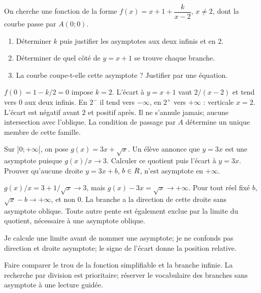 \label{t11s-c03-p01}
On cherche une fonction de la forme $f(x)=x+1+\dfrac{k}{x-2}$, $x\ne2$, dont la courbe passe par $A(0;0)$.
\begin{enumerate}
\item Déterminer $k$ puis justifier les asymptotes aux deux infinis et en $2$.
\item Déterminer de quel côté de $y=x+1$ se trouve chaque branche.
\item La courbe coupe-t-elle cette asymptote ? Justifier par une équation.
\end{enumerate}
\begin{corrige}\label{sol-t11s-c03-p01}
$f(0)=1-k/2=0$ impose $k=2$. L’écart à $y=x+1$ vaut $2/(x-2)$ et tend vers $0$ aux deux infinis. En $2^-$ il tend vers $-\infty$, en $2^+$ vers $+\infty$ : verticale $x=2$. L’écart est négatif avant $2$ et positif après. Il ne s’annule jamais; aucune intersection avec l’oblique. La condition de passage par $A$ détermine un unique membre de cette famille.
\end{corrige}
\label{t11s-c03-p02}
Sur $]0;+\infty[$, on pose $g(x)=3x+\sqrt x$. Un élève annonce que $y=3x$ est une asymptote puisque $g(x)/x\to3$. Calculer ce quotient puis l’écart à $y=3x$. Prouver qu’aucune droite $y=3x+b$, $b\in R$, n’est asymptote en $+\infty$.
\begin{corrige}\label{sol-t11s-c03-p02}
$g(x)/x=3+1/\sqrt x\to3$, mais $g(x)-3x=\sqrt x\to+\infty$. Pour tout réel fixé $b$, $\sqrt x-b\to+\infty$, et non $0$. La branche a la direction de cette droite sans asymptote oblique. Toute autre pente est également exclue par la limite du quotient, nécessaire à une asymptote oblique.
\end{corrige}

\begin{jemeteste}Je calcule une limite avant de nommer une asymptote; je ne confonds pas direction et droite asymptote; le signe de l’écart donne la position relative.\end{jemeteste}
\begin{notepourlaclasse}Faire comparer le trou de la fonction simplifiable et la branche infinie. La recherche par division est prioritaire; réserver le vocabulaire des branches sans asymptote à une lecture guidée.\end{notepourlaclasse}
